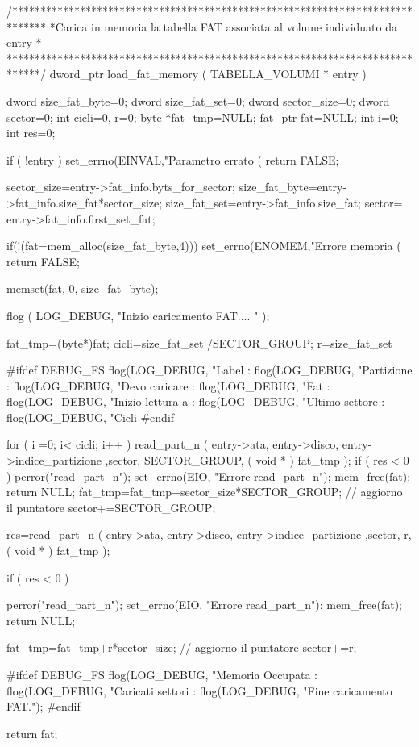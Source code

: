 /******************************************************************************
 *Carica in memoria la tabella FAT associata al volume individuato da entry   *
 ******************************************************************************/
dword_ptr  load_fat_memory ( TABELLA_VOLUMI * entry ) {

    dword size_fat_byte=0;
    dword size_fat_set=0;
    dword sector_size=0;
    dword sector=0; 
    int cicli=0, r=0;
    byte *fat_tmp=NULL;
    fat_ptr fat=NULL; 
    int i=0;
    	int res=0; 
    
    if ( !entry ) {
      set_errno(EINVAL,"Parametro errato (%
      return FALSE;
    }
    
    sector_size=entry->fat_info.byts_for_sector;
    size_fat_byte=entry->fat_info.size_fat*sector_size;
    size_fat_set=entry->fat_info.size_fat; 
    sector= entry->fat_info.first_set_fat; 
 
    if(!(fat=mem_alloc(size_fat_byte,4))){
      set_errno(ENOMEM,"Errore memoria (%
      return FALSE; 
    }
    
    memset(fat, 0, size_fat_byte); 

    flog ( LOG_DEBUG, "Inizio caricamento FAT.... " );

    
    fat_tmp=(byte*)fat;
    cicli=size_fat_set /SECTOR_GROUP;
    r=size_fat_set%
    
#ifdef DEBUG_FS
    flog(LOG_DEBUG, "Label            : %
    flog(LOG_DEBUG, "Partizione       : %
    flog(LOG_DEBUG, "Devo caricare    : %
    flog(LOG_DEBUG, "Fat              : %
    flog(LOG_DEBUG, "Inizio lettura a : %
    flog(LOG_DEBUG, "Ultimo settore   : %
    flog(LOG_DEBUG, "Cicli %
#endif

    for ( i =0; i< cicli; i++ ) {
	read_part_n ( entry->ata, entry->disco, entry->indice_partizione ,sector, SECTOR_GROUP, ( void * ) fat_tmp );    
 	if ( res < 0 ) { 
	    perror("read_part_n");
	    set_errno(EIO, "Errore read_part_n"); 
	    mem_free(fat); 
	    return NULL; 
	}
	fat_tmp=fat_tmp+sector_size*SECTOR_GROUP; // aggiorno il puntatore 
 	sector+=SECTOR_GROUP;
      }
     

    res=read_part_n ( entry->ata, entry->disco, entry->indice_partizione ,sector, r, ( void * ) fat_tmp );    
    
    if ( res < 0 ) { 
	    perror("read_part_n");
	    set_errno(EIO, "Errore read_part_n"); 
	    mem_free(fat); 
	    return NULL; 
      
    }
    
    fat_tmp=fat_tmp+r*sector_size; // aggiorno il puntatore 
    sector+=r;
    
#ifdef DEBUG_FS
    flog(LOG_DEBUG, "Memoria Occupata : %
    flog(LOG_DEBUG, "Caricati settori : %
    flog(LOG_DEBUG, "Fine caricamento  FAT."); 
#endif

       return fat; 
  
}
